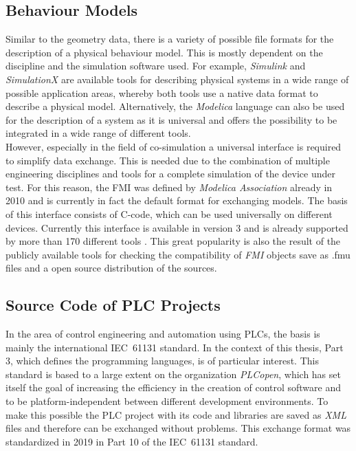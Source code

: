 \subsection{Behaviour Models}	%
    Similar to the geometry data, there is a variety of possible file formats for the description of a physical behaviour model. This is mostly dependent on the discipline and the simulation software used. For example, \textit{Simulink} and \textit{SimulationX} are available tools for describing physical systems in a wide range of possible application areas, whereby both tools use a native data format to describe a physical model. Alternatively, the \textit{Modelica} language can also be used for the description of a system as it is universal and offers the possibility to be integrated in a wide range of different tools.\\
    
    However, especially in the field of co-simulation a universal interface is required to simplify data exchange. This is needed due to the combination of multiple engineering disciplines and tools for a complete simulation of the device under test. For this reason, the \ac{FMI} was defined by \textit{Modelica Association} already in 2010 and is currently in fact the default format for exchanging models. The basis of this interface consists of C-code, which can be used universally on different devices. Currently this interface is available in version 3 and is already supported by more than 170 different tools \cite{FmiSpecification}. This great popularity is also the result of the publicly available tools for checking the compatibility of \textit{FMI} objects save as \ac{.fmu} files and a open source distribution of the sources. 

\subsection{Source Code of PLC Projects}		%
    In the area of control engineering and automation using PLCs, the basis is mainly the international IEC~61131 standard. In the context of this thesis, Part 3, which defines the programming languages, is of particular interest. 
    This standard is based to a large extent on the organization \textit{PLCopen}, which has set itself the goal of increasing the efficiency in the creation of control software and to be platform-independent between different development environments. To make this possible the PLC project with its code and libraries are saved as \textit{XML} files and therefore can be exchanged without problems. This exchange format was standardized in 2019 in Part 10 of the IEC~61131 standard. \\
    
